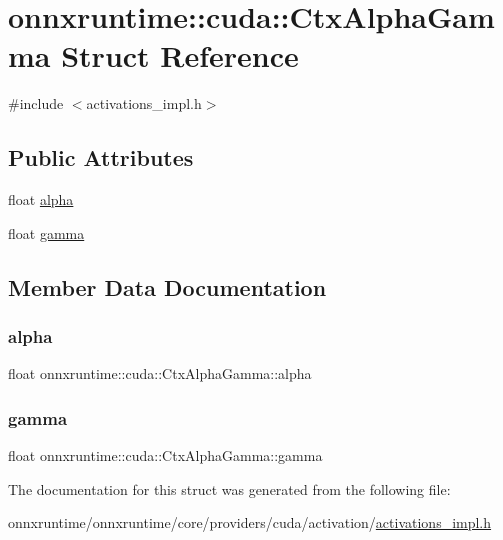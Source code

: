 \hypertarget{structonnxruntime_1_1cuda_1_1CtxAlphaGamma}{}\section{onnxruntime\+:\+:cuda\+:\+:Ctx\+Alpha\+Gamma Struct Reference}
\label{structonnxruntime_1_1cuda_1_1CtxAlphaGamma}


{\ttfamily \#include $<$activations\+\_\+impl.\+h$>$}

\subsection*{Public Attributes}
\begin{DoxyCompactItemize}
\item 
float \mbox{\hyperlink{structonnxruntime_1_1cuda_1_1CtxAlphaGamma_ad898f78ce5c7fb49204bad9ab7a13c0d}{alpha}}
\item 
float \mbox{\hyperlink{structonnxruntime_1_1cuda_1_1CtxAlphaGamma_ae3e492698121bd1697b17456cc466ac9}{gamma}}
\end{DoxyCompactItemize}


\subsection{Member Data Documentation}
\mbox{\label{structonnxruntime_1_1cuda_1_1CtxAlphaGamma_ad898f78ce5c7fb49204bad9ab7a13c0d}} 
\subsubsection{\texorpdfstring{alpha}{alpha}}
{\footnotesize\ttfamily float onnxruntime\+::cuda\+::\+Ctx\+Alpha\+Gamma\+::alpha}

\mbox{\label{structonnxruntime_1_1cuda_1_1CtxAlphaGamma_ae3e492698121bd1697b17456cc466ac9}} 
\subsubsection{\texorpdfstring{gamma}{gamma}}
{\footnotesize\ttfamily float onnxruntime\+::cuda\+::\+Ctx\+Alpha\+Gamma\+::gamma}



The documentation for this struct was generated from the following file\+:\begin{DoxyCompactItemize}
\item 
onnxruntime/onnxruntime/core/providers/cuda/activation/\mbox{\hyperlink{activations__impl_8h}{activations\+\_\+impl.\+h}}\end{DoxyCompactItemize}

